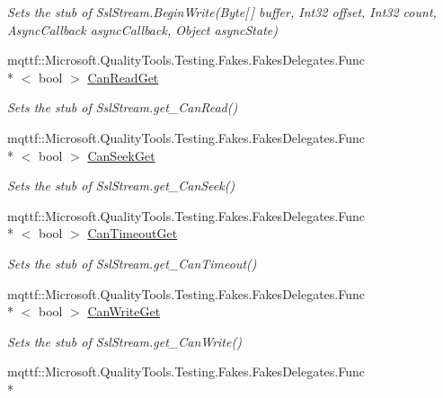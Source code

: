 \begin{DoxyCompactItemize}
\begin{DoxyCompactList}\small\item\em Sets the stub of Ssl\-Stream.\-Begin\-Write(\-Byte\mbox{[}$\,$\mbox{]} buffer, Int32 offset, Int32 count, Async\-Callback async\-Callback, Object async\-State)\end{DoxyCompactList}\item 
mqttf\-::\-Microsoft.\-Quality\-Tools.\-Testing.\-Fakes.\-Fakes\-Delegates.\-Func\\*
$<$ bool $>$ \hyperlink{class_system_1_1_net_1_1_security_1_1_fakes_1_1_stub_ssl_stream_a229bc4ef34ae9c8c02ee9aa2d465a40b}{Can\-Read\-Get}
\begin{DoxyCompactList}\small\item\em Sets the stub of Ssl\-Stream.\-get\-\_\-\-Can\-Read()\end{DoxyCompactList}\item 
mqttf\-::\-Microsoft.\-Quality\-Tools.\-Testing.\-Fakes.\-Fakes\-Delegates.\-Func\\*
$<$ bool $>$ \hyperlink{class_system_1_1_net_1_1_security_1_1_fakes_1_1_stub_ssl_stream_a1d61f8cb762faf404b80da67517edb97}{Can\-Seek\-Get}
\begin{DoxyCompactList}\small\item\em Sets the stub of Ssl\-Stream.\-get\-\_\-\-Can\-Seek()\end{DoxyCompactList}\item 
mqttf\-::\-Microsoft.\-Quality\-Tools.\-Testing.\-Fakes.\-Fakes\-Delegates.\-Func\\*
$<$ bool $>$ \hyperlink{class_system_1_1_net_1_1_security_1_1_fakes_1_1_stub_ssl_stream_a8f384ee7195337012410a38f7fd4f5e7}{Can\-Timeout\-Get}
\begin{DoxyCompactList}\small\item\em Sets the stub of Ssl\-Stream.\-get\-\_\-\-Can\-Timeout()\end{DoxyCompactList}\item 
mqttf\-::\-Microsoft.\-Quality\-Tools.\-Testing.\-Fakes.\-Fakes\-Delegates.\-Func\\*
$<$ bool $>$ \hyperlink{class_system_1_1_net_1_1_security_1_1_fakes_1_1_stub_ssl_stream_a1f51bc2235ad5afcf4dad2219e6a7893}{Can\-Write\-Get}
\begin{DoxyCompactList}\small\item\em Sets the stub of Ssl\-Stream.\-get\-\_\-\-Can\-Write()\end{DoxyCompactList}\item 
mqttf\-::\-Microsoft.\-Quality\-Tools.\-Testing.\-Fakes.\-Fakes\-Delegates.\-Func\\*

\end{DoxyCompactItemize}
